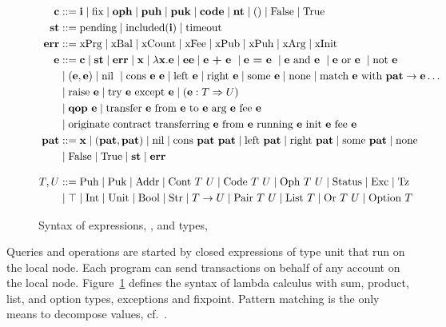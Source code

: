 \documentclass[runningheads]{llncs}
\begin{document}
\begin{figure}[tp]
\begin{align*}
  \CONSTANT & ::= \INT \mid \FIX
              \mid \OPH \mid \PUH \mid\PUK \mid \CODE \mid
              \NTEZ \mid \SUNIT \mid \FALSE \mid \TRUE \\
  \STATUS & ::= \STATUSPENDING \mid \STATUSINCLUDING (\INT) \mid
            \STATUSTIMEOUT \\
  \ERROR &::= \ERRPRG \mid \ERRBAL \mid \ERRCOUNT \mid \ERRFEE \mid
           \ERRPUK \mid \ERRPUH \mid \ERRARG \mid \ERRINIT\\
	\EXPR & :: =  \CONSTANT \mid \STATUS \mid \ERROR \mid \VARIABLE \mid \lambda \VARIABLE. \EXPR
	\mid \EXPR\EXPR  %
  \mid \EXPR\ \PLUS\ \EXPR\ \mid
  \EXPR\ \EQUAL\ \EXPR\
  \mid \EXPR\ \AND\ \EXPR\ \mid \EXPR\ \OR\ \EXPR\ \mid \NOT\ \EXPR
  \\& \mid (\EXPR,\EXPR)\mid \NIL\ \mid \CONS\ \EXPR\ \EXPR \mid \LEFT\ \EXPR \mid\RIGHT\
  \EXPR \mid \SOME\ \EXPR \mid \NONE
  \mid \MATCH\ \EXPR\ \WITH\ \PATTERN\to\EXPR \dots 
  \\& \mid \RAISE\ \EXPR \mid \TRY\ \EXPR\ \EXCEPT\ \EXPR \mid \CAST\EXPR\TYPE\TYPEU
  \\& \mid \QOP\  \EXPR \mid \TRANSFER[\EXPR]\EXPR\EXPR\EXPR\EXPR
  \\& \mid \ORIGINATE\EXPR\EXPR\EXPR\EXPR\EXPR
  \\
  \PATTERN &::= \VARIABLE \mid (\PATTERN, \PATTERN) \mid \NIL \mid \CONS\ \PATTERN\ \PATTERN \mid \LEFT\ \PATTERN \mid\RIGHT\
             \PATTERN \mid \SOME\ \PATTERN \mid \NONE \\
            &\mid \FALSE \mid \TRUE \mid \STATUS \mid \ERROR
  \\[2ex]
  \TYPE, \TYPEU & ::=
                  \TPUH \mid
                  \TPUK \mid
                  \TADDR \mid 
                  \TCONTRACT\ \TYPE\ \TYPEU \mid
                  \TCODE\ \TYPE\ \TYPEU \mid
                  \TOPH\ \TYPE\ \TYPEU \mid
                  \TSTATUS \mid \TEXCEPTION \mid \TTEZ \\
  & \mid \TNO \mid \TINT \mid \TUNIT \mid \TBOOL \mid \TSTRING \mid \TYPE\to\TYPEU \mid \TPAIR\ \TYPE\ \TYPEU \mid \TLIST\ \TYPE
    \mid \TSUM\ \TYPE\ \TYPEU \mid \TOPTION\ \TYPE 
\end{align*}
  \caption{Syntax of expressions, \EXPR, and types, \TYPE}
  \label{fig:syntax-expressions}
\end{figure}
Queries and operations are started by closed
expressions of type unit that run on the
local node. Each program can send transactions on behalf of any
account on the local node.  Figure~\ref{fig:syntax-expressions}
defines the syntax of lambda calculus with sum, product, list, and option types, exceptions and fixpoint.
Pattern matching is the only means to decompose values, cf.\ \PATTERN. 
\end{document}
